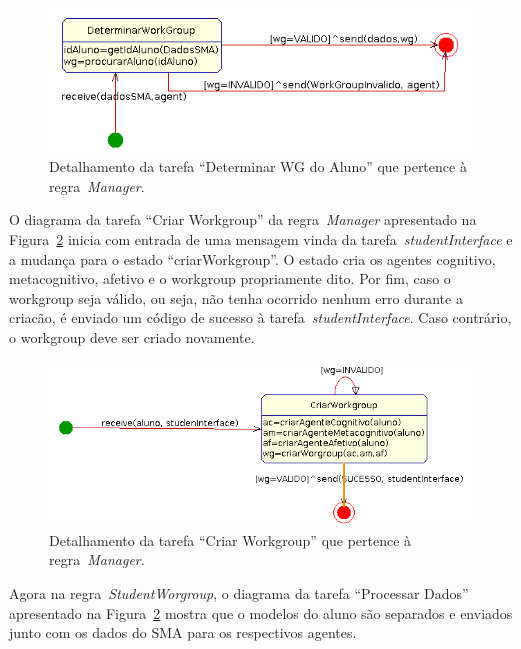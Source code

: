\begin{figure}
	\centering
	\includegraphics[scale=0.48]{images/td-determinar-wg.png}
	\caption{Detalhamento da tarefa ``Determinar WG do Aluno'' que pertence à regra~\emph{Manager}.}
	\label{fig:td-determinar-wg}
\end{figure}

O diagrama da tarefa ``Criar Workgroup'' da regra~\emph{Manager} apresentado na Figura~\ref{fig:td-criar-wg} inicia com entrada de uma mensagem vinda da tarefa~\emph{studentInterface} e a mudança para o estado ``criarWorkgroup''. O estado cria os agentes cognitivo, metacognitivo, afetivo e o workgroup propriamente dito. Por fim, caso o workgroup seja válido, ou seja, não tenha ocorrido nenhum erro durante a criacão, é enviado um código de sucesso à tarefa~\emph{studentInterface}. Caso contrário, o workgroup deve ser criado novamente.

\begin{figure}
	\centering
	\includegraphics[scale=0.48]{images/td-criar-wg.png}
	\caption{Detalhamento da tarefa ``Criar Workgroup'' que pertence à regra~\emph{Manager}.}
	\label{fig:td-criar-wg}
\end{figure}

Agora na regra~\emph{StudentWorgroup}, o diagrama da tarefa ``Processar Dados'' apresentado na Figura~\ref{fig:td-criar-wg} mostra que o modelos do aluno são separados e enviados junto com os dados do SMA para os respectivos agentes.

